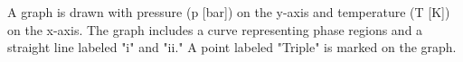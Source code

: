A graph is drawn with pressure (p [bar]) on the y-axis and temperature (T [K]) on the x-axis. The graph includes a curve representing phase regions and a straight line labeled "i" and "ii." A point labeled "Triple" is marked on the graph.